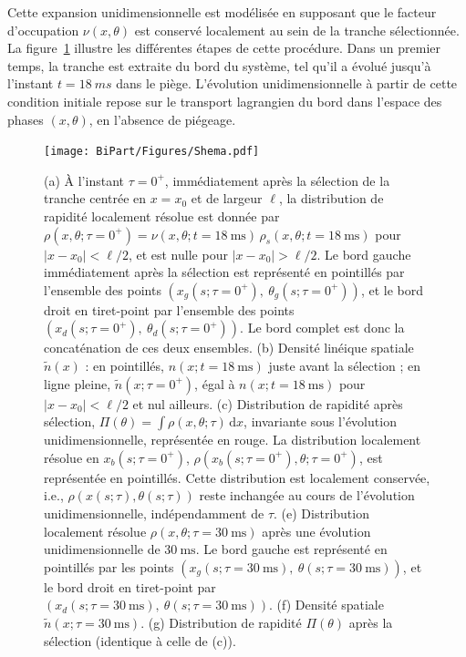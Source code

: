 \medskip

Cette expansion unidimensionnelle est modélisée en supposant que le facteur d’occupation $\nu(x,\theta)$ est conservé localement au sein de la tranche sélectionnée. La figure~\ref{fig:BiPart.coupure2} illustre les différentes étapes de cette procédure.
Dans un premier temps, la tranche est extraite du bord du système, tel qu’il a évolué jusqu’à l’instant $t = 18~ms$ dans le piège. L’évolution unidimensionnelle à partir de cette condition initiale repose sur le transport lagrangien du bord dans l’espace des phases $(x,\theta)$, en l’absence de piégeage.

\begin{figure}[!htb]
	\centering
	\texttt{[image: BiPart/Figures/Shema.pdf]}
	\caption{
(a) À l'instant $\tau = 0^+$, immédiatement après la sélection de la tranche centrée en $x = x_0$ et de largeur $\ell$, la distribution de rapidité localement résolue est donnée par $\rho(x,\theta ; \tau = 0^+) = \nu(x, \theta ; t = 18~\mathrm{ms}) \, \rho_s(x,\theta ; t = 18~\mathrm{ms})$ pour $\vert x - x_0 \vert < \ell/2$, et est nulle pour $\vert x - x_0 \vert > \ell/2$. Le bord gauche immédiatement après la sélection est représenté en pointillés par l’ensemble des points $(x_g(s; \tau = 0^+),\ \theta_g(s; \tau = 0^+))$, et le bord droit en tiret-point par l’ensemble des points $(x_d(s; \tau = 0^+),\ \theta_d(s; \tau = 0^+))$. Le bord complet est donc la concaténation de ces deux ensembles. 
(b) Densité linéique spatiale $\tilde{n}(x)$ : en pointillés, $n(x; t = 18~\mathrm{ms})$ juste avant la sélection ; en ligne pleine, $\tilde{n}(x; \tau = 0^+)$, égal à $n(x; t = 18~\mathrm{ms})$ pour $\vert x - x_0 \vert < \ell/2$ et nul ailleurs. 
(c) Distribution de rapidité après sélection, $\Pi(\theta) = \int \rho(x,\theta ; \tau)\,\mathrm{d}x$, invariante sous l’évolution unidimensionnelle, représentée en rouge. La distribution localement résolue en $x_b(s; \tau = 0^+)$, $\rho(x_b(s; \tau = 0^+), \theta ; \tau = 0^+)$, est représentée en pointillés. Cette distribution est localement conservée, i.e., $\rho(x(s; \tau), \theta(s; \tau))$ reste inchangée au cours de l’évolution unidimensionnelle, indépendamment de $\tau$. 
(e) Distribution localement résolue $\rho(x, \theta ; \tau = 30~\mathrm{ms})$ après une évolution unidimensionnelle de $30~\mathrm{ms}$. Le bord gauche est représenté en pointillés par les points $(x_g(s; \tau = 30~\mathrm{ms}),\ \theta(s; \tau = 30~\mathrm{ms}))$, et le bord droit en tiret-point par $(x_d(s; \tau = 30~\mathrm{ms}),\ \theta(s; \tau = 30~\mathrm{ms}))$. 
(f) Densité spatiale $\tilde{n}(x; \tau = 30~\mathrm{ms})$. 
(g) Distribution de rapidité $\Pi(\theta)$ après la sélection (identique à celle de (c)).
}
	\label{fig:BiPart.coupure2}
	
\end{figure}


